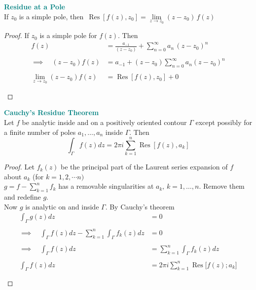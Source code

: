 \documentclass[11pt,a4paper]{article}
\theoremstyle{definition}
\begin{document}
\textbf{\textcolor{teal}{Residue at a Pole}}\\
If $z_0$ is a simple pole, then $\,\boxed{\operatorname{Res}[f(z), z_0] = \lim\limits_{z\rightarrow z_0} (z - z_0)\,f(z)}$\\


\begin{proof}
If $z_0$ is a simple pole for $f(z)$. Then
\begin{align*}
f(z) & = \frac{a_{-1}}{(z - z_0)} + \sum^{\infty}_{n = 0} a_n \, (z - z_0)^n\\\\
\implies \quad  (z - z_0) f(z) & = a_{-1} + (z - z_0) \sum^{\infty}_{n= 0} a_n (z- z_0)^n\\\\
\lim_{z \rightarrow z_0} (z-z_0)f(z) & = \operatorname{Res}[f(z), z_0] + 0\\\\
\end{align*}
\end{proof}

\textbf{\textcolor{teal}{Cauchy's Residue Theorem}}\\
Let $f$  be analytic inside and on a positively oriented contour $\Gamma$ except possibly for a finite number of poles $a_1, \ldots, a_n$ inside $\Gamma$. Then $$\int_{\Gamma} f(z)dz = 2\pi i \sum^n_{k = 1} \operatorname{Res}[ f(z), a_k]$$




\begin{proof}
Let $f_k(z)$ be the principal part of the Laurent series expansion of $f$ about $a_k$ (for $k = 1, 2,\cdots n)$\\
$g = f - \displaystyle{\sum^n_{k = 1} f_k}$ has a removable singularities at $a_k,\, k = 1, \ldots, n$. Remove them and redefine $g$.\\
Now $g$ is analytic on and inside $\Gamma$. By Cauchy's theorem
\begin{align*}
\int_{\Gamma} g(z) dz & = 0\\\\
\implies \quad  \int_{\Gamma} f(z) dz  - \sum^n_{k = 1}\int_{\Gamma} f_k (z) dz & = 0\\\\
\implies \quad  \int_{\Gamma} f(z) dz & = \sum^n_{k = 1} \int_{\Gamma} f_k (z) dz\\\\
\int_{\Gamma}f(z) dz & = 2\pi i \sum^n_{k = 1} \operatorname{Res}\big[f(z); a_k\big]\\\\
\end{align*}
\end{proof}
\end{document}
